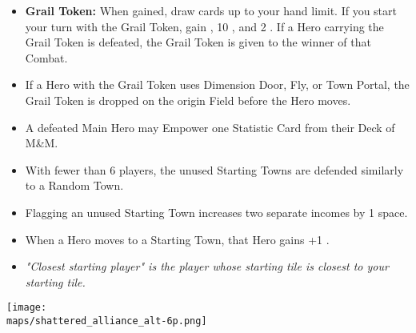 \begin{multicols*}{2}
\begin{itemize}
  \item \textbf{Grail Token:} When gained, draw cards up to your hand limit. If you start your turn with the Grail Token, gain , 10 , and 2 . If a Hero carrying the Grail Token is defeated, the Grail Token is given to the winner of that Combat.
  \item If a Hero with the Grail Token uses Dimension Door, Fly, or Town Portal, the Grail Token is dropped on the origin Field before the Hero moves.
  \item A defeated Main Hero may Empower one Statistic Card from their Deck of M\&M.
  \item With fewer than 6 players, the unused Starting Towns are defended similarly to a Random Town.
  \item Flagging an unused Starting Town increases two separate incomes by 1 space.
  \item When a Hero moves to a Starting Town, that Hero gains +1 .
  \item \textit{"Closest starting player" is the player whose starting tile is closest to your starting tile.}
\end{itemize}

\vspace*{\fill}

\begin{center}
  \texttt{[image: \\maps/shattered\_alliance\_alt-6p.png]}
  \vspace*{\fill}
\end{center}

\end{multicols*}
